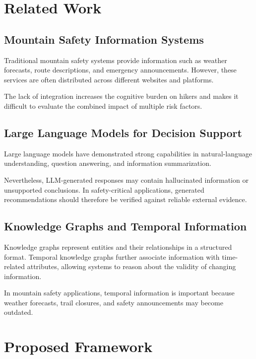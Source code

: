 \documentclass[conference]{IEEEtran}
\begin{document}
\section{Related Work}

\subsection{Mountain Safety Information Systems}

Traditional mountain safety systems provide information such as
weather forecasts, route descriptions, and emergency announcements.
However, these services are often distributed across different
websites and platforms.

The lack of integration increases the cognitive burden on hikers
and makes it difficult to evaluate the combined impact of multiple
risk factors.

\subsection{Large Language Models for Decision Support}

Large language models have demonstrated strong capabilities in
natural-language understanding, question answering, and information
summarization.

Nevertheless, LLM-generated responses may contain hallucinated
information or unsupported conclusions. In safety-critical
applications, generated recommendations should therefore be
verified against reliable external evidence.

\subsection{Knowledge Graphs and Temporal Information}

Knowledge graphs represent entities and their relationships in a
structured format. Temporal knowledge graphs further associate
information with time-related attributes, allowing systems to
reason about the validity of changing information.

In mountain safety applications, temporal information is important
because weather forecasts, trail closures, and safety announcements
may become outdated.

\section{Proposed Framework}
\end{document}

